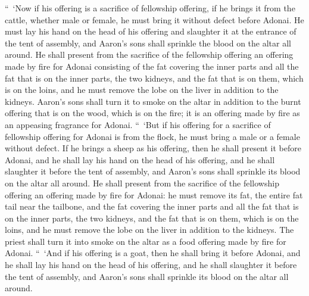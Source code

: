 \begin{biblechapter} %
 “ ‘Now if his offering is a sacrifice of fellowship offering, if he brings it from the cattle, whether male or female, he must bring it without defect before Adonai.
\verse He must lay his hand on the head of his offering and slaughter it at the entrance of the tent of assembly, and Aaron’s sons shall sprinkle the blood on the altar all around.
\verse He shall present from the sacrifice of the fellowship offering an offering made by fire for Adonai consisting of the fat covering the inner parts and all the fat that is on the inner parts,
\verse the two kidneys, and the fat that is on them, which is on the loins, and he must remove the lobe on the liver in addition to the kidneys.
\verse Aaron’s sons shall turn it to smoke on the altar in addition to the burnt offering that is on the wood, which is on the fire; it is an offering made by fire as an appeasing fragrance for Adonai.
\verse “ ‘But if his offering for a sacrifice of fellowship offering for Adonai is from the flock, he must bring a male or a female without defect.
\verse If he brings a sheep as his offering, then he shall present it before Adonai,
\verse and he shall lay his hand on the head of his offering, and he shall slaughter it before the tent of assembly, and Aaron’s sons shall sprinkle its blood on the altar all around.
\verse He shall present from the sacrifice of the fellowship offering an offering made by fire for Adonai: he must remove its fat, the entire fat tail near the tailbone, and the fat covering the inner parts and all the fat that is on the inner parts,
\verse the two kidneys, and the fat that is on them, which is on the loins, and he must remove the lobe on the liver in addition to the kidneys.
\verse The priest shall turn it into smoke on the altar as a food offering made by fire for Adonai.
\verse “ ‘And if his offering is a goat, then he shall bring it before Adonai,
\verse and he shall lay his hand on the head of his offering, and he shall slaughter it before the tent of assembly, and Aaron’s sons shall sprinkle its blood on the altar all around.

\end{biblechapter}
